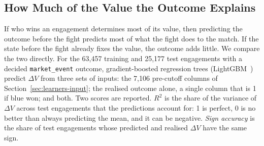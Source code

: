 \subsection{How Much of the Value the Outcome Explains}\label{sec:limit-explained}

If who wins an engagement determines most of its value, then predicting the outcome before the fight
predicts most of what the fight does to the match. If the state before the fight already fixes the
value, the outcome adds little. We compare the two directly. For the 63,457 training and 25,177 test
engagements with a decided \texttt{market\_event} outcome, gradient-boosted regression trees
(LightGBM~\cite{ke2017lightgbm}) predict $\Delta V$ from three sets of inputs: the 7,106 pre-cutoff
columns of Section~\ref{sec:learners-input}; the realised outcome alone, a single column that is 1 if blue
won; and both. Two scores are reported. $R^2$ is the share of the variance of $\Delta V$ across test
engagements that the predictions account for: 1 is perfect, 0 is no better than always predicting the
mean, and it can be negative. \emph{Sign accuracy} is the share of test engagements whose predicted and
realised $\Delta V$ have the same sign.

